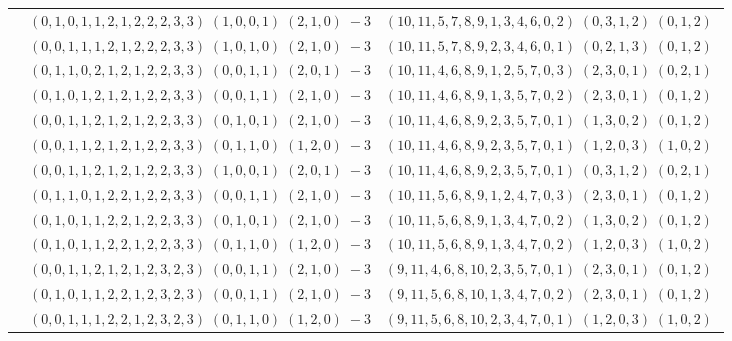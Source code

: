 \documentclass[11pt]{article}
\begin{document}
\begin{longtable}[l]{|c|c|c|}
 \cline{2-3} 
 & $(0 ,1 ,0 ,1 ,1 ,2 ,1 ,2 ,2 ,2 ,3 ,3) \;(1 ,0 ,0 ,1) \;(2 ,1 ,0) \;-3$ & $(10 ,11 ,5 ,7 ,8 ,9 ,1 ,3 ,4 ,6 ,0 ,2) \;(0 ,3 ,1 ,2) \;(0 ,1 ,2) \;$\\ 
 \cline{2-3} 
 & $(0 ,0 ,1 ,1 ,1 ,2 ,1 ,2 ,2 ,2 ,3 ,3) \;(1 ,0 ,1 ,0) \;(2 ,1 ,0) \;-3$ & $(10 ,11 ,5 ,7 ,8 ,9 ,2 ,3 ,4 ,6 ,0 ,1) \;(0 ,2 ,1 ,3) \;(0 ,1 ,2) \;$\\ 
 \cline{2-3} 
 & $(0 ,1 ,1 ,0 ,2 ,1 ,2 ,1 ,2 ,2 ,3 ,3) \;(0 ,0 ,1 ,1) \;(2 ,0 ,1) \;-3$ & $(10 ,11 ,4 ,6 ,8 ,9 ,1 ,2 ,5 ,7 ,0 ,3) \;(2 ,3 ,0 ,1) \;(0 ,2 ,1) \;$\\ 
 \cline{2-3} 
 & $(0 ,1 ,0 ,1 ,2 ,1 ,2 ,1 ,2 ,2 ,3 ,3) \;(0 ,0 ,1 ,1) \;(2 ,1 ,0) \;-3$ & $(10 ,11 ,4 ,6 ,8 ,9 ,1 ,3 ,5 ,7 ,0 ,2) \;(2 ,3 ,0 ,1) \;(0 ,1 ,2) \;$\\ 
 \cline{2-3} 
 & $(0 ,0 ,1 ,1 ,2 ,1 ,2 ,1 ,2 ,2 ,3 ,3) \;(0 ,1 ,0 ,1) \;(2 ,1 ,0) \;-3$ & $(10 ,11 ,4 ,6 ,8 ,9 ,2 ,3 ,5 ,7 ,0 ,1) \;(1 ,3 ,0 ,2) \;(0 ,1 ,2) \;$\\ 
 \cline{2-3} 
 & $(0 ,0 ,1 ,1 ,2 ,1 ,2 ,1 ,2 ,2 ,3 ,3) \;(0 ,1 ,1 ,0) \;(1 ,2 ,0) \;-3$ & $(10 ,11 ,4 ,6 ,8 ,9 ,2 ,3 ,5 ,7 ,0 ,1) \;(1 ,2 ,0 ,3) \;(1 ,0 ,2) \;$\\ 
 \cline{2-3} 
 & $(0 ,0 ,1 ,1 ,2 ,1 ,2 ,1 ,2 ,2 ,3 ,3) \;(1 ,0 ,0 ,1) \;(2 ,0 ,1) \;-3$ & $(10 ,11 ,4 ,6 ,8 ,9 ,2 ,3 ,5 ,7 ,0 ,1) \;(0 ,3 ,1 ,2) \;(0 ,2 ,1) \;$\\ 
 \cline{2-3} 
 & $(0 ,1 ,1 ,0 ,1 ,2 ,2 ,1 ,2 ,2 ,3 ,3) \;(0 ,0 ,1 ,1) \;(2 ,1 ,0) \;-3$ & $(10 ,11 ,5 ,6 ,8 ,9 ,1 ,2 ,4 ,7 ,0 ,3) \;(2 ,3 ,0 ,1) \;(0 ,1 ,2) \;$\\ 
 \cline{2-3} 
 & $(0 ,1 ,0 ,1 ,1 ,2 ,2 ,1 ,2 ,2 ,3 ,3) \;(0 ,1 ,0 ,1) \;(2 ,1 ,0) \;-3$ & $(10 ,11 ,5 ,6 ,8 ,9 ,1 ,3 ,4 ,7 ,0 ,2) \;(1 ,3 ,0 ,2) \;(0 ,1 ,2) \;$\\ 
 \cline{2-3} 
 & $(0 ,1 ,0 ,1 ,1 ,2 ,2 ,1 ,2 ,2 ,3 ,3) \;(0 ,1 ,1 ,0) \;(1 ,2 ,0) \;-3$ & $(10 ,11 ,5 ,6 ,8 ,9 ,1 ,3 ,4 ,7 ,0 ,2) \;(1 ,2 ,0 ,3) \;(1 ,0 ,2) \;$\\ 
 \cline{2-3} 
 & $(0 ,0 ,1 ,1 ,2 ,1 ,2 ,1 ,2 ,3 ,2 ,3) \;(0 ,0 ,1 ,1) \;(2 ,1 ,0) \;-3$ & $(9 ,11 ,4 ,6 ,8 ,10 ,2 ,3 ,5 ,7 ,0 ,1) \;(2 ,3 ,0 ,1) \;(0 ,1 ,2) \;$\\ 
 \cline{2-3} 
 & $(0 ,1 ,0 ,1 ,1 ,2 ,2 ,1 ,2 ,3 ,2 ,3) \;(0 ,0 ,1 ,1) \;(2 ,1 ,0) \;-3$ & $(9 ,11 ,5 ,6 ,8 ,10 ,1 ,3 ,4 ,7 ,0 ,2) \;(2 ,3 ,0 ,1) \;(0 ,1 ,2) \;$\\ 
 \cline{2-3} 
 & $(0 ,0 ,1 ,1 ,1 ,2 ,2 ,1 ,2 ,3 ,2 ,3) \;(0 ,1 ,1 ,0) \;(1 ,2 ,0) \;-3$ & $(9 ,11 ,5 ,6 ,8 ,10 ,2 ,3 ,4 ,7 ,0 ,1) \;(1 ,2 ,0 ,3) \;(1 ,0 ,2) \;$\\ 

\end{longtable}
\end{document}
